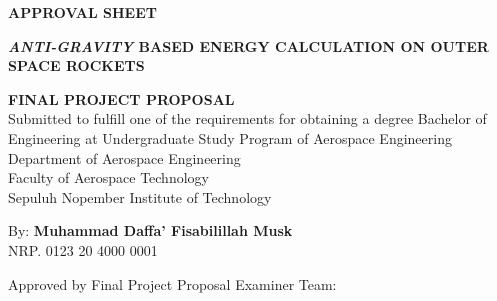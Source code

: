 \begin{center}
	\large
  \textbf{APPROVAL SHEET}
\end{center}

\thispagestyle{empty}

\begin{center}
  \textbf{\emph{ANTI-GRAVITY} BASED ENERGY CALCULATION ON OUTER SPACE ROCKETS}
\end{center}

\begingroup
  \small

  \begin{center}
    \textbf{FINAL PROJECT PROPOSAL} \\
    Submitted to fulfill one of the requirements for obtaining a degree
    Bachelor of Engineering at 
    Undergraduate Study Program of Aerospace Engineering \\
    Department of Aerospace Engineering \\
    Faculty of Aerospace Technology \\
    Sepuluh Nopember Institute of Technology
  \end{center}

  \begin{center}
    By: \textbf{Muhammad Daffa' Fisabilillah Musk} \\
    NRP. 0123 20 4000 0001
  \end{center}

  \begin{center}
    Approved by Final Project Proposal Examiner Team:
  \end{center}

  \begingroup
    \setlength{\tabcolsep}{0pt}

